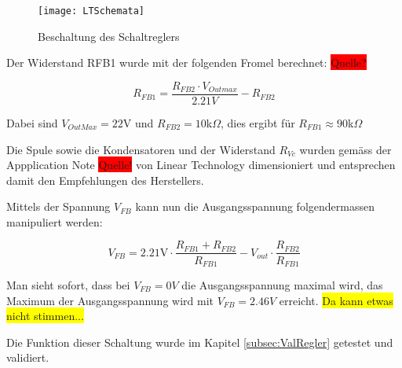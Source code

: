 \begin{figure}[h]
\centering
\texttt{[image: LTSchemata]}%
\caption{Beschaltung des Schaltreglers}%
\label{fig::LTSchemata}%
\end{figure}

Der Widerstand RFB1 wurde mit der folgenden Fromel berechnet: \colorbox{red}{Quelle?}

\[
R_{FB1}=\frac{R_{FB2}\cdot V_{Outmax}}{2.21V}-R_{FB2}
\]

Dabei sind $V_{OutMax} =22$V und $R_{FB2} =10$k$\Omega$, dies ergibt für $R_{FB1} \approx 90$k$\Omega$

Die Spule sowie die Kondensatoren und der Widerstand $R_{Vc}$ wurden gemäss der Appplication Note \colorbox{red}{Quelle!} von Linear Technology dimensioniert und entsprechen damit den Empfehlungen des Herstellers.

Mittels der Spannung $V_{FB}$ kann nun die Ausgangsspannung folgendermassen manipuliert werden:

\[
V_{FB}=2.21\text{V}\cdot\frac{R_{FB1}+R_{FB2}}{R_{FB1}}-V_{out}\cdot\frac{R_{FB2}}{R_{FB1}}
\]

Man sieht sofort, dass bei $V_{FB}=0V$ die Ausgangsspannung maximal wird, das Maximum der Ausgangsspannung wird mit $V_{FB}=2.46V$  erreicht. \colorbox{yellow}{Da kann etwas nicht stimmen...}

Die Funktion dieser Schaltung wurde im Kapitel \ref{subsec:ValRegler} getestet und validiert.